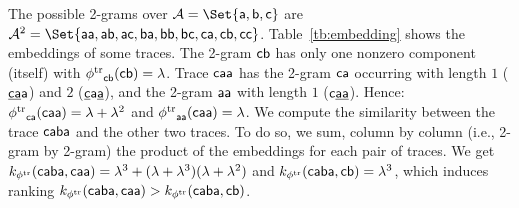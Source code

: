 \begin{table}[t!]
\vspace{+0.5cm}
\caption{Embedding of traces $\const{caba}$, $\const{caa}$ and $\const{cb}$.}\label{tb:embedding}
\centering
{}
\vspace{-0.5cm}
\end{table}

\begin{example}\label{ex:wheredotiszero} %
The possible 2-grams over $\tasks=\Set{\const{a},\const{b},\const{c}}$ are
$\tasks^2=\Set{\const{aa},\const{ab},\const{ac},\const{ba},\const{bb},\const{bc},\const{ca},\const{cb},\const{cc}}$.
Table~\ref{tb:embedding} shows the embeddings of some traces. The 2-gram $\const{cb}$ has only one nonzero component
(itself) with ${\phi^{\text{tr}}}_{\mathsf{cb}}(\mathsf{cb})=\lambda$. Trace $\const{caa}$ has the 2-gram $\mathsf{ca}$ occurring with
length $1$ ($\mathsf{\underline{ca}a}$) and $2$ ($\mathsf{\underline{c}a\underline{a}}$), and the 2-gram $\mathsf{aa}$ with
length $1$ ($\mathsf{c\underline{aa}}$). Hence: ${\phi^{\text{tr}}}_{\mathsf{ca}}(\mathsf{caa})=\lambda+\lambda^2$ and
${\phi^{\text{tr}}}_{\mathsf{aa}}(\mathsf{caa})=\lambda$.
We compute the similarity between the trace $\const{caba}$ and the other two traces. To do so, we sum, column by column
(i.e., 2-gram by 2-gram) the product of the embeddings for each pair of traces. We get
$k_{{\phi^{\text{tr}}}}(\mathsf{caba},\mathsf{caa})=\lambda^3+(\lambda+\lambda^3)(\lambda+\lambda^2)$ and
$k_{{\phi^{\text{tr}}}}(\mathsf{caba},\mathsf{cb})=\lambda^3$,
which induces ranking $
k_{{\phi^{\text{tr}}}}(\mathsf{caba},\mathsf{caa})>
k_{{\phi^{\text{tr}}}}(\mathsf{caba},\mathsf{cb})
$.
\end{example}



